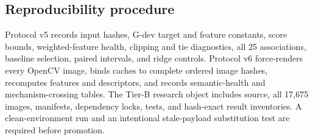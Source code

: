 \subsection{Reproducibility procedure}

Protocol v5 records input hashes, G-dev target and feature constants, score bounds, weighted-feature health, clipping and tie diagnostics, all 25 associations, baseline selection, paired intervals, and ridge controls. Protocol v6 force-renders every OpenCV image, binds caches to complete ordered image hashes, recomputes features and descriptors, and records semantic-health and mechanism-crossing tables. The Tier-B research object includes source, all 17,675 images, manifests, dependency locks, tests, and hash-exact result inventories. A clean-environment run and an intentional stale-payload substitution test are required before promotion.
